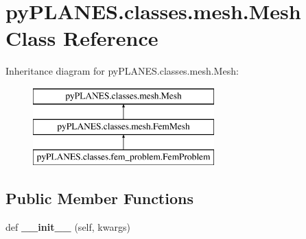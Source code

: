 \hypertarget{classpy_p_l_a_n_e_s_1_1classes_1_1mesh_1_1_mesh}{}\section{py\+P\+L\+A\+N\+E\+S.\+classes.\+mesh.\+Mesh Class Reference}
\label{classpy_p_l_a_n_e_s_1_1classes_1_1mesh_1_1_mesh}
Inheritance diagram for py\+P\+L\+A\+N\+E\+S.\+classes.\+mesh.\+Mesh\+:\begin{figure}[H]
\begin{center}
\leavevmode
\includegraphics[height=3.000000cm]{classpy_p_l_a_n_e_s_1_1classes_1_1mesh_1_1_mesh}
\end{center}
\end{figure}
\subsection*{Public Member Functions}
\begin{DoxyCompactItemize}
\item 
\mbox{\label{classpy_p_l_a_n_e_s_1_1classes_1_1mesh_1_1_mesh_a36ee9e8746e4cc5bda5f6ef8c1c0515a}} 
def {\bfseries \+\_\+\+\_\+init\+\_\+\+\_\+} (self, kwargs)
\end{DoxyCompactItemize}
